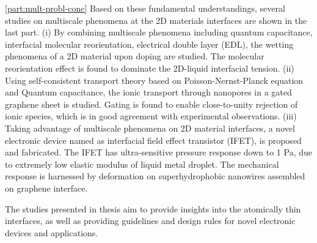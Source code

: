 \autoref{part:mult-probl-conc} Based on these fundamental understandings, several
studies on multiscale phenomena at the 2D materials interfaces are
shown in the last part.
%
(i) By combining multiscale phenomena including quantum capacitance,
interfacial molecular reorientation, electrical double layer (EDL),
the wetting phenomena of a 2D material upon doping are studied. The
molecular reorientation effect is found to dominate the 2D-liquid
interfacial tension.
%
(ii) Using self-consistent transport theory based on
Poisson-Nernst-Planck equation and Quantum capacitance, the ionic
transport through nanopores in a gated graphene sheet is
studied. Gating is found to enable close-to-unity rejection of ionic
species, which is in good agreement with experimental observations.
%
(iii) Taking advantage of multiscale phenomena on 2D material
interfaces, a novel electronic device named as interfacial field
effect transistor (IFET), is proposed and fabricated. The IFET has
ultra-sensitive pressure response down to 1 Pa, due to extremely low
elastic modulus of liquid metal droplet. The mechanical response is
harnessed by deformation on superhydrophobic nanowires assembled on
graphene interface.

The studies presented in thesis aim to provide insights into the
atomically thin interfaces, as well as providing guidelines and design rules for novel electronic devices and applications.



